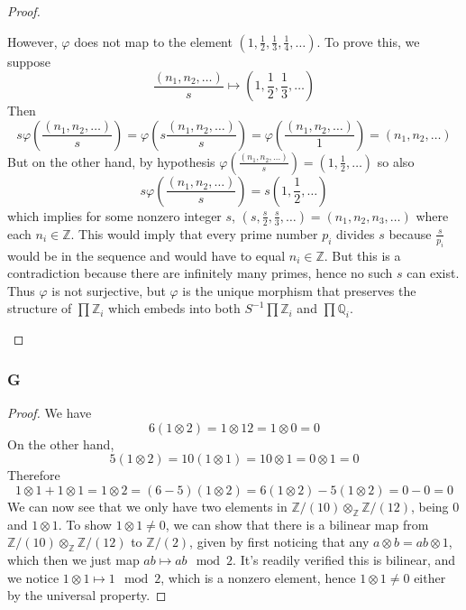 \documentclass{article}
\newcommand{\Z}{\mathbb{Z}}
\newcommand{\Q}{\mathbb{Q}}
\begin{document}
\begin{proof}
\begin{enumerate}[(a)]
\begin{center}
    \end{center}
    However, $\varphi$ does not map to the element $(1,\frac{1}{2},\frac{1}{3},\frac{1}{4},\dots)$. To prove this, we suppose
    \[
    \frac{(n_1,n_2,\dots)}{s}\mapsto (1,\frac{1}{2},\frac{1}{3},\dots)
    \]
    Then
    \[
    s\varphi(\frac{(n_1,n_2,\dots)}{s})=\varphi(s\frac{(n_1,n_2,\dots)}{s})=\varphi(\frac{(n_1,n_2,\dots)}{1})=(n_1,n_2,\dots)
    \]
    But on the other hand, by hypothesis $\varphi(\frac{(n_1,n_2,\dots)}{s})=(1,\frac{1}{2},\dots)$ so also
    \[
    s\varphi(\frac{(n_1,n_2,\dots)}{s})=s(1,\frac{1}{2},\dots)
    \]
    which implies for some nonzero integer $s$, $(s,\frac{s}{2},\frac{s}{3},\dots)=(n_1,n_2,n_3,\dots)$ where each $n_i\in \Z$. This would imply that every prime number $p_i$ divides $s$ because $\frac{s}{p_i}$ would be in the sequence and would have to equal $n_i\in \Z$. But this is a contradiction because there are infinitely many primes, hence no such $s$ can exist. Thus $\varphi$ is not surjective, but $\varphi$ is the unique morphism that preserves the structure of $\prod \Z_i$ which embeds into both $S^{-1}\prod \Z_i$ and $\prod \Q_i$.
\end{enumerate}



\end{proof}
\subsubsection{G}\label{1.3.G}
\begin{proof}
    We have
    \[
    6(1\otimes 2)=1\otimes 12=1\otimes 0=0
    \]
    On the other hand,
    \[
    5(1\otimes 2)=10(1\otimes 1)=10\otimes 1=0\otimes 1=0
    \]
    Therefore
    \[
    1\otimes 1+1\otimes 1=1\otimes 2=(6-5)(1\otimes 2)=6(1\otimes 2)-5(1\otimes 2)=0-0=0
    \]
    We can now see that we only have two elements in $\Z/(10)\otimes_\Z \Z/(12)$, being $0$ and $1\otimes 1$. To show $1\otimes 1\ne 0$, we can show that there is a bilinear map from $\Z/(10)\otimes_\Z \Z/(12)$ to $\Z/(2)$, given by first noticing that any $a\otimes b=ab\otimes 1$, which then we just map $ab\mapsto ab\mod 2$. It's readily verified this is bilinear, and we notice $1\otimes 1\mapsto 1\mod 2$, which is a nonzero element, hence $1\otimes 1\ne 0$ either by the universal property.
\end{proof}
\end{document}
